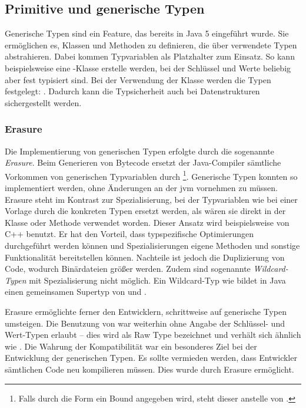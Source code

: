 \subsection{Primitive und generische Typen}\label{subsec:primitive-generics}

Generische Typen sind ein Feature, das bereits in Java 5 eingeführt wurde.
Sie ermöglichen es, Klassen und Methoden zu definieren, die über verwendete Typen abstrahieren.
Dabei kommen Typvariablen als Platzhalter zum Einsatz.
So kann beispielsweise eine -Klasse erstelle werden, bei der Schlüssel und Werte beliebig aber fest typisiert sind.
Bei der Verwendung der Klasse werden die Typen festgelegt: .
Dadurch kann die Typsicherheit auch bei Datenstrukturen sichergestellt werden.

\subsubsection{Erasure}

Die Implementierung von generischen Typen erfolgte durch die sogenannte \emph{Erasure}.
Beim Generieren von Bytecode ersetzt der Java-Compiler sämtliche Vorkommen von generischen Typvariablen durch \footnote{Falls durch die Form  ein Bound angegeben wird, steht dieser anstelle von .}.
Generische Typen konnten so implementiert werden, ohne Änderungen an der \ac{jvm} vornehmen zu müssen.
Erasure steht im Kontrast zur Spezialisierung, bei der Typvariablen wie bei einer Vorlage durch die konkreten Typen ersetzt werden, als wären sie direkt in der Klasse oder Methode verwendet worden.
Dieser Ansatz wird beispielsweise von C++ benutzt.
Er hat den Vorteil, dass typspezifische Optimierungen durchgeführt werden können und Spezialisierungen eigene Methoden und sonstige Funktionalität bereitstellen können.
Nachteile ist jedoch die Duplizierung von Code, wodurch Binärdateien größer werden.
Zudem sind sogenannte \emph{Wildcard-Typen} mit Spezialisierung nicht möglich.
Ein Wildcard-Typ wie  bildet in Java einen gemeinsamen Supertyp von  und .

Erasure ermöglichte ferner den Entwicklern, schrittweise auf generische Typen umsteigen.
Die Benutzung von  war weiterhin ohne Angabe der Schlüssel- und Wert-Typen erlaubt -- dies wird als Raw Type bezeichnet und verhält sich ähnlich wie .
Die Wahrung der Kompatibilität war ein besonderes Ziel bei der Entwicklung der generischen Typen.
Es sollte vermieden werden, dass Entwickler sämtlichen Code neu kompilieren müssen.
Dies wurde durch Erasure ermöglicht.

